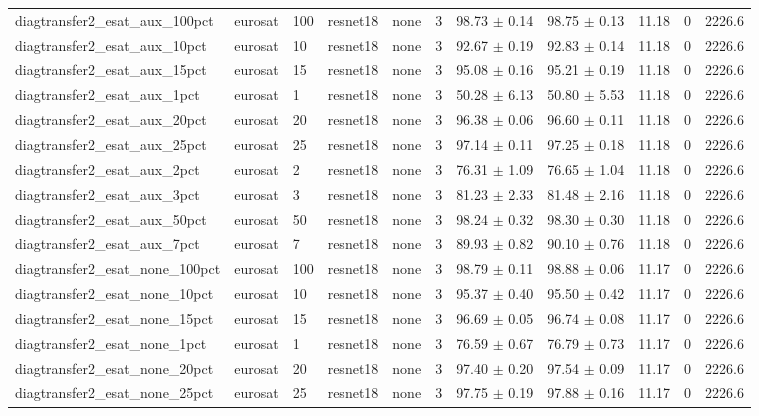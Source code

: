 \begin{tabular}{lllllllllll}
diagtransfer2_esat_aux_100pct & eurosat & 100 & resnet18 & none & 3 & 98.73 $\pm$ 0.14 & 98.75 $\pm$ 0.13 & 11.18 & 0 & 2226.6 \\
diagtransfer2_esat_aux_10pct & eurosat & 10 & resnet18 & none & 3 & 92.67 $\pm$ 0.19 & 92.83 $\pm$ 0.14 & 11.18 & 0 & 2226.6 \\
diagtransfer2_esat_aux_15pct & eurosat & 15 & resnet18 & none & 3 & 95.08 $\pm$ 0.16 & 95.21 $\pm$ 0.19 & 11.18 & 0 & 2226.6 \\
diagtransfer2_esat_aux_1pct & eurosat & 1 & resnet18 & none & 3 & 50.28 $\pm$ 6.13 & 50.80 $\pm$ 5.53 & 11.18 & 0 & 2226.6 \\
diagtransfer2_esat_aux_20pct & eurosat & 20 & resnet18 & none & 3 & 96.38 $\pm$ 0.06 & 96.60 $\pm$ 0.11 & 11.18 & 0 & 2226.6 \\
diagtransfer2_esat_aux_25pct & eurosat & 25 & resnet18 & none & 3 & 97.14 $\pm$ 0.11 & 97.25 $\pm$ 0.18 & 11.18 & 0 & 2226.6 \\
diagtransfer2_esat_aux_2pct & eurosat & 2 & resnet18 & none & 3 & 76.31 $\pm$ 1.09 & 76.65 $\pm$ 1.04 & 11.18 & 0 & 2226.6 \\
diagtransfer2_esat_aux_3pct & eurosat & 3 & resnet18 & none & 3 & 81.23 $\pm$ 2.33 & 81.48 $\pm$ 2.16 & 11.18 & 0 & 2226.6 \\
diagtransfer2_esat_aux_50pct & eurosat & 50 & resnet18 & none & 3 & 98.24 $\pm$ 0.32 & 98.30 $\pm$ 0.30 & 11.18 & 0 & 2226.6 \\
diagtransfer2_esat_aux_7pct & eurosat & 7 & resnet18 & none & 3 & 89.93 $\pm$ 0.82 & 90.10 $\pm$ 0.76 & 11.18 & 0 & 2226.6 \\
diagtransfer2_esat_none_100pct & eurosat & 100 & resnet18 & none & 3 & 98.79 $\pm$ 0.11 & 98.88 $\pm$ 0.06 & 11.17 & 0 & 2226.6 \\
diagtransfer2_esat_none_10pct & eurosat & 10 & resnet18 & none & 3 & 95.37 $\pm$ 0.40 & 95.50 $\pm$ 0.42 & 11.17 & 0 & 2226.6 \\
diagtransfer2_esat_none_15pct & eurosat & 15 & resnet18 & none & 3 & 96.69 $\pm$ 0.05 & 96.74 $\pm$ 0.08 & 11.17 & 0 & 2226.6 \\
diagtransfer2_esat_none_1pct & eurosat & 1 & resnet18 & none & 3 & 76.59 $\pm$ 0.67 & 76.79 $\pm$ 0.73 & 11.17 & 0 & 2226.6 \\
diagtransfer2_esat_none_20pct & eurosat & 20 & resnet18 & none & 3 & 97.40 $\pm$ 0.20 & 97.54 $\pm$ 0.09 & 11.17 & 0 & 2226.6 \\
diagtransfer2_esat_none_25pct & eurosat & 25 & resnet18 & none & 3 & 97.75 $\pm$ 0.19 & 97.88 $\pm$ 0.16 & 11.17 & 0 & 2226.6 \\

\end{tabular}
